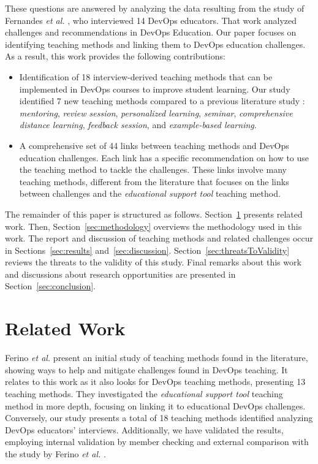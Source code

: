 \documentclass[10pt,conference]{IEEEtran}
\begin{document}
These questions are answered by analyzing the data resulting from the study of Fernandes \textit{et al.} \cite{fernandes:2022}, who interviewed 14 DevOps educators. That work analyzed challenges and recommendations in DevOps Education. Our paper focuses on identifying teaching methods and linking them to DevOps education challenges. As a result, this work provides the following contributions:

 \begin{itemize}
\item Identification of 18 interview-derived teaching methods that can be implemented in DevOps courses to improve student learning. Our study identified 7 new teaching methods compared to a previous literature study \cite{ferino:2021}: \textsl{mentoring},  \textsl{review session},  \textsl{personalized learning},  \textsl{seminar},  \textsl{comprehensive distance learning}, \textsl{feedback session}, and \textsl{example-based learning}. 

\item A comprehensive set of 44 links between teaching methods and DevOps education challenges. Each link has a specific recommendation on how to use the teaching method to tackle the challenges. These links involve many teaching methods, different from the literature \cite{ferino:2021} that focuses on the links between challenges and the \textsl{educational support tool} teaching method.

\end{itemize}





The remainder of this paper is structured as follows.  Section~\ref{sec:relatedWork} presents related work. Then, Section~\ref{sec:methodology} overviews the methodology used in this work. The report and discussion of teaching methods and related challenges occur in Sections~\ref{sec:results}  and~\ref{sec:discussion}.
Section~\ref{sec:threatsToValidity} reviews the threats to the validity of this study. Final remarks about this work and discussions about research opportunities are presented in Section~\ref{sec:conclusion}.


\section{Related Work}   \label{sec:relatedWork}

Ferino \textit{et al.} \cite{ferino:2021} present an initial study of teaching methods found in the literature, showing ways to help and mitigate challenges found in DevOps teaching. It relates to this work as it also looks for DevOps teaching methods, presenting 13 teaching methods. They investigated the \textsl{educational support tool} teaching method in more depth, focusing on linking it to educational DevOps challenges. Conversely, our study presents  a total of 18 teaching methods identified analyzing DevOps educators' interviews. Additionally, we have validated the results, employing internal validation by member checking and external comparison with the study by Ferino \textit{et al.} \cite{ferino:2021}.
\end{document}
